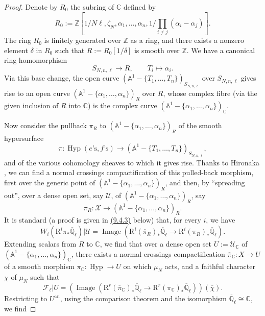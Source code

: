 \begin{proof}
Denote by \(R_0\) the subring of \(\mathbb{C}\) defined by
\[
R_0:=\mathbb{Z}[1/N\ell,\zeta_N,\alpha_1,\ldots,\alpha_n,1/\prod_{i\ne j}(\alpha_i-\alpha_j)].
\]
The ring \(R_0\) is finitely generated over \(\mathbb{Z}\) as a ring, and there exists a nonzero element \(\delta\) in \(R_0\) such that \(R:=R_0[1/\delta]\) is smooth over \(\mathbb{Z}\). We have a canonical ring homomorphism
\[
S_{N,n,\ell}\to R,\qquad T_i\mapsto \alpha_i.
\]
Via this base change, the open curve \((\mathbb{A}^1-\{T_1,\ldots,T_n\})_{S_{N,n,\ell}}\) over \(S_{N,n,\ell}\) gives rise to an open curve \((\mathbb{A}^1-\{\alpha_1,\ldots,\alpha_n\})_R\) over \(R\), whose complex fibre (via the given inclusion of \(R\) into \(\mathbb{C}\)) is the complex curve \((\mathbb{A}^1-\{\alpha_1,\ldots,\alpha_n\})_{\mathbb{C}}\).

Now consider the pullback \(\pi_R\) to \((\mathbb{A}^1-\{\alpha_1,\ldots,\alpha_n\})_R\) of the smooth hypersurface
\[
\pi:\operatorname{Hyp}(e\text{'s},f\text{'s})\to(\mathbb{A}^1-\{T_1,\ldots,T_n\})_{S_{N,n,\ell}},
\]
and of the various cohomology sheaves to which it gives rise. Thanks to Hironaka \cite[Corollary~3 of Theorem~2]{Hir-RS}, we can find a normal crossings compactification of this pulled-back morphism, first over the generic point of \((\mathbb{A}^1-\{\alpha_1,\ldots,\alpha_n\})_R\), and then, by ``spreading out'', over a dense open set, say \(\mathcal{U}\), of \((\mathbb{A}^1-\{\alpha_1,\ldots,\alpha_n\})_R\), say
\[
\overline{\pi}_R:\mathcal{X}\to(\mathbb{A}^1-\{\alpha_1,\ldots,\alpha_n\})_R.
\]
It is standard (a proof is given in \hyperref[par:9.4.3]{(9.4.3)} below) that, for every \(i\), we have
\[
W_i(\mathrm{R}^i\pi_*\overline{\mathbb{Q}}_\ell)|\mathcal{U}
=\operatorname{Image}(\mathrm{R}^i(\overline{\pi}_R)_*\overline{\mathbb{Q}}_\ell\to\mathrm{R}^i(\pi_R)_*\overline{\mathbb{Q}}_\ell).
\]
Extending scalars from \(R\) to \(\mathbb{C}\), we find that over a dense open set \(U:=\mathcal{U}_{\mathbb{C}}\) of \((\mathbb{A}^1-\{\alpha_1,\ldots,\alpha_n\})_{\mathbb{C}}\), there exists a normal crossings compactification \(\overline{\pi}_{\mathbb{C}}:X\to U\) of a smooth morphism \(\pi_{\mathbb{C}}:\operatorname{Hyp}\to U\) on which \(\mu_N\) acts, and a faithful character \(\chi\) of \(\mu_N\) such that
\[
\mathcal{F}_\ell|U=(\operatorname{Image}(\mathrm{R}^r(\overline{\pi}_{\mathbb{C}})_*\overline{\mathbb{Q}}_\ell\to\mathrm{R}^r(\pi_{\mathbb{C}})_*\overline{\mathbb{Q}}_\ell))(\overline{\chi}).
\]
Restricting to \(U^{\mathrm{an}}\), using the comparison theorem \cite[Exposé~XVI, 4.1]{SGA} and the isomorphism \(\overline{\mathbb{Q}}_\ell\cong\mathbb{C}\), we find

\end{proof}
